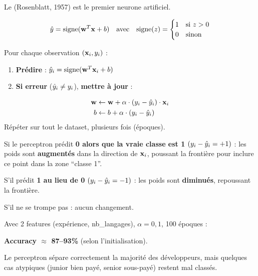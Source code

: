 Le  (Rosenblatt, 1957) est le premier neurone artificiel.

\begin{definitionbox}
    \begin{equation}
        \hat{y} = \text{signe}(\mathbf{w}^T \mathbf{x} + b)
        \quad\text{avec}\quad
        \text{signe}(z) = \begin{cases} 1 & \text{si } z > 0 \\ 0 & \text{sinon} \end{cases}
        \label{eq:perceptron}
    \end{equation}
\end{definitionbox}

\begin{definitionbox}
    Pour chaque observation $(\mathbf{x}_i, y_i)$ :
    \begin{enumerate}
        \item \textbf{Pr\'{e}dire} : $\hat{y}_i = \text{signe}(\mathbf{w}^T \mathbf{x}_i + b)$
        \item \textbf{Si erreur} ($\hat{y}_i \neq y_i$), \textbf{mettre \`{a} jour} :
    \end{enumerate}
    \begin{align}
        \mathbf{w} &\leftarrow \mathbf{w} + \alpha \cdot (y_i - \hat{y}_i) \cdot \mathbf{x}_i
        \label{eq:update-w} \\
        b   &\leftarrow b + \alpha \cdot (y_i - \hat{y}_i)
        \label{eq:update-b}
    \end{align}
    R\'{e}p\'{e}ter sur tout le dataset, plusieurs fois (\'{e}poques).
\end{definitionbox}

\begin{intuitionbox}[Fonctionnement]
    Si le perceptron pr\'{e}dit \textbf{0 alors que la vraie classe est 1}
    $(y_i - \hat{y}_i = +1)$ :
    les poids sont \textbf{augment\'{e}s} dans la direction de $\mathbf{x}_i$,
    poussant la fronti\`{e}re pour inclure ce point dans la zone ``classe 1''.

    S'il pr\'{e}dit \textbf{1 au lieu de 0} $(y_i - \hat{y}_i = -1)$ :
    les poids sont \textbf{diminu\'{e}s}, repoussant la fronti\`{e}re.

    S'il ne se trompe pas : aucun changement.
\end{intuitionbox}

\begin{exemplebox}
    Avec 2 features (exp\'{e}rience, nb\_langages), $\alpha = 0{,}1$, 100 \'{e}poques :

    \medskip
    \textbf{Accuracy $\approx$ 87--93\%} (selon l'initialisation).

    Le perceptron s\'{e}pare correctement la majorit\'{e} des d\'{e}veloppeurs,
    mais quelques cas atypiques (junior bien pay\'{e}, senior sous-pay\'{e})
    restent mal class\'{e}s.
\end{exemplebox}

